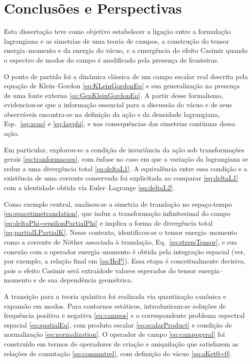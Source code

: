 \chapter{Conclusões e Perspectivas}

Esta dissertação teve como objetivo estabelecer a ligação entre a formulação lagrangiana e as simetrias de uma teoria de campos, a construção do tensor energia--momento e da energia do vácuo, e a emergência do efeito Casimir quando o espectro de modos do campo é modificado pela presença de fronteiras.

O ponto de partida foi a dinâmica clássica de um campo escalar real descrita pela equação de Klein--Gordon \eqref{eq:KLeinGordonEq} e sua generalização na presença de uma fonte externa \eqref{eq:GenKleinGordonEq}. A partir desse formalismo, evidenciou-se que a informação essencial para a discussão do vácuo e de seus observáveis encontra-se na definição da ação e da densidade lagrangiana, Eqs.~\eqref{eq:acao} e \eqref{eq:lagphi}, e nas consequências das simetrias contínuas dessa ação.

Em particular, explorou-se a condição de invariância da ação sob transformações gerais \eqref{eq:tranformacoes}, com ênfase no caso em que a variação da lagrangiana se reduz a uma divergência total \eqref{eq:deltaL1}. A equivalência entre essa condição e a existência de uma corrente conservada foi explicitada ao comparar \eqref{eq:deltaL1} com a identidade obtida via Euler--Lagrange \eqref{eq:deltaL2}.

Como exemplo central, analisou-se a simetria de translação no espaço-tempo \eqref{eq:spacetimetranslation}, que induz a transformação infinitesimal do campo \eqref{eq:deltaPhi=epsilonPartialPhi} e implica a forma de divergência total \eqref{eq:partialLPartialK}. Nesse contexto, identificou-se o tensor energia--momento como a corrente de Nöther associada à translação, Eq.~\eqref{eq:stressTensor}, e sua conexão com o operador energia--momento é obtida pela integração espacial (ver, por exemplo, a relação final em \eqref{eq:HeP}). Essa etapa é conceitualmente decisiva, pois o efeito Casimir será extraídode valores esperados do tensor energia--momento e de sua dependência geométrica.

A transição para a teoria quântica foi realizada via quantização canônica e expansão em modos. Para contornos estáticos, introduziram-se soluções de frequência positiva e negativa \eqref{eq:campos} e o correspondente problema espectral espacial \eqref{eq:spatialEq}, com produto escalar \eqref{eq:scalarProduct} e condição de normalização \eqref{eq:normalization}. O operador de campo \eqref{eq:campogeral} foi construído em termos de operadores de criação e aniquilação que satisfazem as relações de comutação \eqref{eq:commutrel}, com definição do vácuo \eqref{eq:aKet0=0}. 

